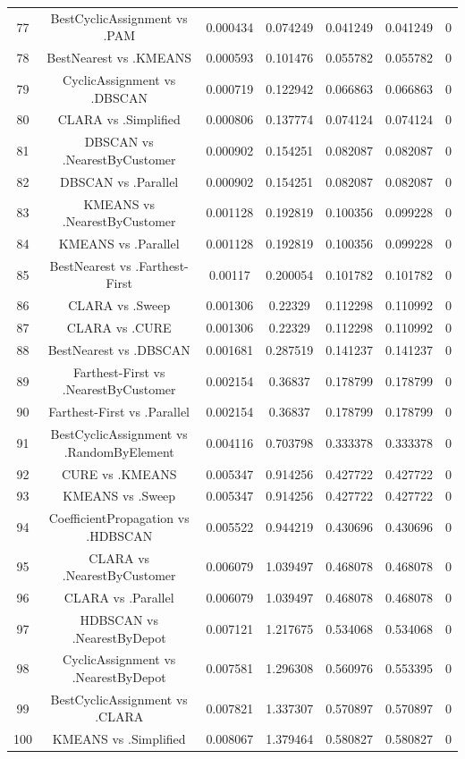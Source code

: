 \documentclass[a4paper,10pt]{article}
\begin{document}
\begin{landscape}
\begin{table}[!htp]
\begin{tabular}{ccccccc}
77&BestCyclicAssignment vs .PAM&0.000434&0.074249&0.041249&0.041249&0\\
78&BestNearest vs .KMEANS&0.000593&0.101476&0.055782&0.055782&0\\
79&CyclicAssignment vs .DBSCAN&0.000719&0.122942&0.066863&0.066863&0\\
80&CLARA vs .Simplified&0.000806&0.137774&0.074124&0.074124&0\\
81&DBSCAN vs .NearestByCustomer&0.000902&0.154251&0.082087&0.082087&0\\
82&DBSCAN vs .Parallel&0.000902&0.154251&0.082087&0.082087&0\\
83&KMEANS vs .NearestByCustomer&0.001128&0.192819&0.100356&0.099228&0\\
84&KMEANS vs .Parallel&0.001128&0.192819&0.100356&0.099228&0\\
85&BestNearest vs .Farthest-First&0.00117&0.200054&0.101782&0.101782&0\\
86&CLARA vs .Sweep&0.001306&0.22329&0.112298&0.110992&0\\
87&CLARA vs .CURE&0.001306&0.22329&0.112298&0.110992&0\\
88&BestNearest vs .DBSCAN&0.001681&0.287519&0.141237&0.141237&0\\
89&Farthest-First vs .NearestByCustomer&0.002154&0.36837&0.178799&0.178799&0\\
90&Farthest-First vs .Parallel&0.002154&0.36837&0.178799&0.178799&0\\
91&BestCyclicAssignment vs .RandomByElement&0.004116&0.703798&0.333378&0.333378&0\\
92&CURE vs .KMEANS&0.005347&0.914256&0.427722&0.427722&0\\
93&KMEANS vs .Sweep&0.005347&0.914256&0.427722&0.427722&0\\
94&CoefficientPropagation vs .HDBSCAN&0.005522&0.944219&0.430696&0.430696&0\\
95&CLARA vs .NearestByCustomer&0.006079&1.039497&0.468078&0.468078&0\\
96&CLARA vs .Parallel&0.006079&1.039497&0.468078&0.468078&0\\
97&HDBSCAN vs .NearestByDepot&0.007121&1.217675&0.534068&0.534068&0\\
98&CyclicAssignment vs .NearestByDepot&0.007581&1.296308&0.560976&0.553395&0\\
99&BestCyclicAssignment vs .CLARA&0.007821&1.337307&0.570897&0.570897&0\\
100&KMEANS vs .Simplified&0.008067&1.379464&0.580827&0.580827&0\\

\end{tabular}
\end{table}
\end{landscape}
\end{document}
